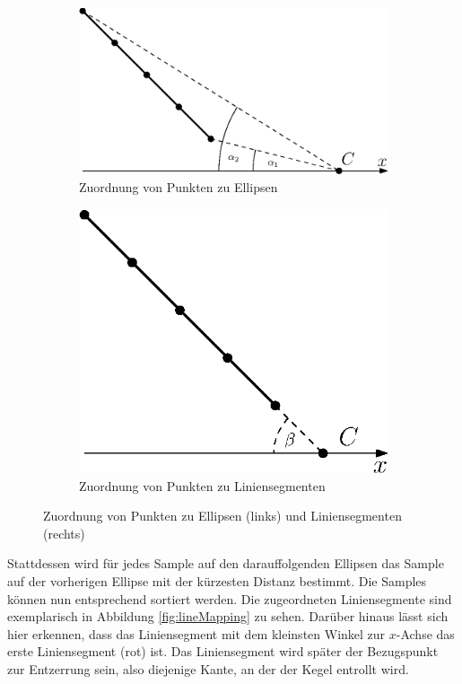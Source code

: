 \begin{figure}[!htb]
	\centering
	\begin{subfigure}{.6\textwidth}
		\centering
		\includegraphics[width=.9\textwidth]{images/sampleMappingProblem.eps}
		\caption{Zuordnung von Punkten zu Ellipsen}
		\label{fig:sampleMappingProblem1}
	\end{subfigure}%
	\begin{subfigure}{.4\textwidth}
		\centering
		\includegraphics[width=.9\textwidth]{images/sampleMappingProblem2.eps}
		\caption{Zuordnung von Punkten zu Liniensegmenten}
		\label{fig:sampleMappingProblem2}
	\end{subfigure}
	\caption{Zuordnung von Punkten zu Ellipsen (links) und Liniensegmenten (rechts)}
	\label{fig:sampleMappingProblem}
\end{figure}

Stattdessen wird für jedes Sample auf den darauffolgenden Ellipsen das Sample auf der vorherigen Ellipse mit der kürzesten Distanz bestimmt.
Die Samples können nun entsprechend sortiert werden. Die zugeordneten Liniensegmente sind exemplarisch in Abbildung \ref{fig:lineMapping} zu sehen. Darüber hinaus lässt sich hier erkennen, dass das Liniensegment mit dem kleinsten Winkel zur $x$-Achse das erste Liniensegment (rot) ist. Das Liniensegment wird später der Bezugspunkt zur Entzerrung sein, also diejenige Kante, an der der Kegel entrollt wird.


